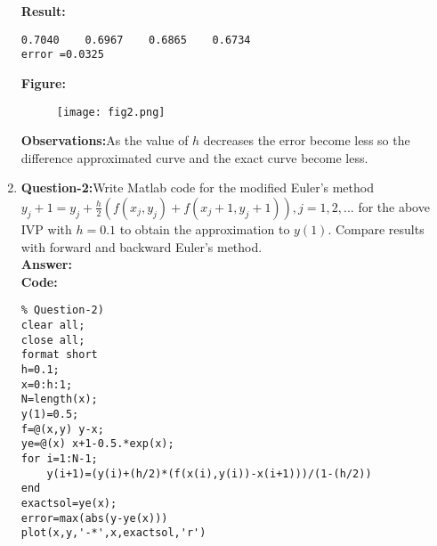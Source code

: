 \documentclass{article}
\begin{document}
\begin{enumerate}
\begin{lstlisting}
\end{lstlisting}
\textbf{Result:}
\begin{lstlisting}
0.7040    0.6967    0.6865    0.6734
error =0.0325
\end{lstlisting}
\textbf{Figure:}
\begin{figure}[H]                                 
	  \centering                          
	  \texttt{[image: fig2.png]}
\caption{}
\label{fig:1.1}                        
  \end{figure}
\textbf{Observations:}As the value of $h$ decreases the error become less so the difference approximated curve and the exact curve become less.
\item \textbf{Question-2:}Write Matlab code for the modified Euler’s method $y_j+1 = y_j+\frac{h}{2}(f(x_j,y_j)+f(x_j+1, y_j+1)),j=1, 2, . . .$ for the above IVP with $h = 0.1$ to obtain the approximation to $y(1)$. Compare results with
forward and backward Euler’s method.\\
\textbf{Answer:}\\
\textbf{Code:}\\
\begin{lstlisting}
% Question-2)
clear all;
close all;
format short 
h=0.1;
x=0:h:1;
N=length(x);
y(1)=0.5;
f=@(x,y) y-x;
ye=@(x) x+1-0.5.*exp(x);
for i=1:N-1;
    y(i+1)=(y(i)+(h/2)*(f(x(i),y(i))-x(i+1)))/(1-(h/2))
end
exactsol=ye(x);
error=max(abs(y-ye(x)))
plot(x,y,'-*',x,exactsol,'r')


\end{lstlisting}
\end{enumerate}
\end{document}
